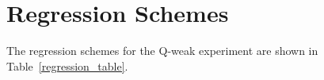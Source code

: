 \chapter{Regression Schemes}
\label{REGRESSION SCHEMES}


The regression schemes for the Q-weak experiment are shown in Table~\ref{regression_table}.

